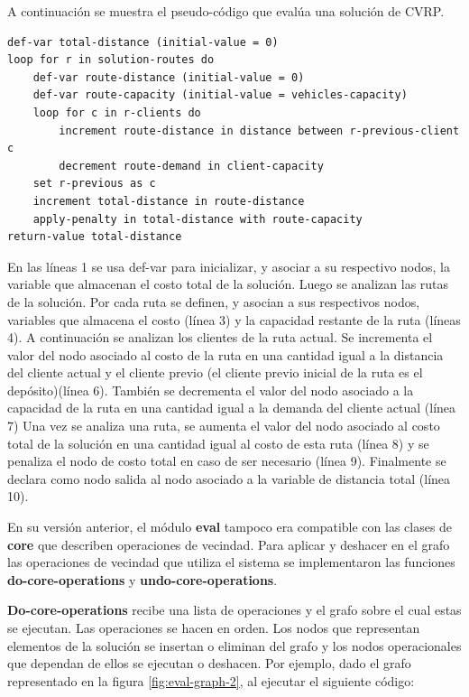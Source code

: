 A continuación se muestra el pseudo-código que evalúa una solución de CVRP.

\begin{lstlisting}
def-var total-distance (initial-value = 0)
loop for r in solution-routes do
	def-var route-distance (initial-value = 0)
	def-var route-capacity (initial-value = vehicles-capacity)	
	loop for c in r-clients do
		increment route-distance in distance between r-previous-client c 
		decrement route-demand in client-capacity	
	set r-previous as c
	increment total-distance in route-distance
	apply-penalty in total-distance with route-capacity
return-value total-distance

\end{lstlisting}

En las líneas 1 se usa def-var para inicializar, y asociar a su respectivo nodos, la variable que almacenan el costo total de la solución. Luego se analizan las rutas de la solución. Por cada ruta se definen, y asocian a sus respectivos nodos, variables que almacena el costo (línea 3) y la capacidad restante de la ruta (líneas 4). A continuación se analizan los clientes de la ruta actual. Se incrementa el valor del nodo asociado al costo de la ruta en una cantidad igual a la distancia del cliente actual y el cliente previo (el cliente previo inicial de la ruta es el depósito)(línea 6). También se decrementa el valor del nodo asociado a la capacidad de la ruta en una cantidad igual a la demanda del cliente actual (línea 7) Una vez se analiza una ruta, se aumenta el valor del nodo asociado al costo total de la solución en una cantidad igual al costo de esta ruta (línea 8) y se penaliza el nodo de costo total en caso de ser necesario (línea 9). Finalmente se declara como nodo salida al nodo asociado a la variable de distancia total (línea 10).

En su versión anterior, el módulo \textbf{eval} tampoco era compatible con las clases de \textbf{core} que describen operaciones de vecindad. Para aplicar y deshacer en el grafo las operaciones de vecindad que utiliza el sistema se implementaron las funciones \textbf{do-core-operations} y \textbf{undo-core-operations}.

\textbf{Do-core-operations} recibe una lista de operaciones y el grafo sobre el cual estas se ejecutan. Las operaciones se hacen en orden. Los nodos que representan elementos de la solución se insertan o eliminan del grafo y los nodos operacionales que dependan de ellos se ejecutan o deshacen. Por ejemplo, dado el grafo representado en la figura \ref{fig:eval-graph-2}, al ejecutar el siguiente código:

